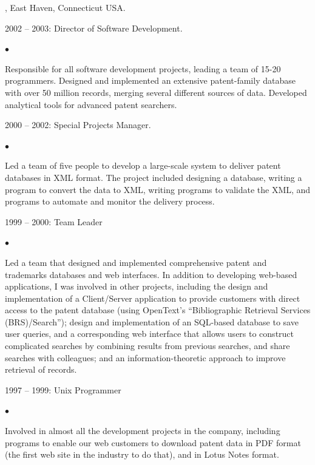 \documentclass[12pt,a4paper]{article}
\newenvironment{list1}{
  \begin{list}{\ding{113}}{%
      \setlength{\itemsep}{0in}
      \setlength{\parsep}{0in} \setlength{\parskip}{0in}
      \setlength{\topsep}{0in} \setlength{\partopsep}{0in}
      \setlength{\leftmargin}{0.17in}}}{\end{list}}
\newenvironment{list2}{
  \begin{list}{$\bullet$}{%
      \setlength{\itemsep}{0in}
      \setlength{\parsep}{0in} \setlength{\parskip}{0in}
      \setlength{\topsep}{0in} \setlength{\partopsep}{0in}
      \setlength{\leftmargin}{0.2in}}}{\end{list}}
\begin{document}
  
, East Haven, Connecticut USA.
\begin{list1}
\item[]  2002 -- 2003:  Director of Software Development.
\begin{list2}
\item[] Responsible for all software development projects, leading a team of 15-20
programmers.
Designed and implemented an extensive patent-family database with over 50
million records, merging several different sources of data. Developed analytical
tools for advanced patent searchers.
\end{list2}
\item[] 2000 -- 2002: Special Projects Manager.
\begin{list2}
\item[] Led a team of five people to develop a large-scale system to deliver patent
databases in XML format.  The project included designing a database, writing a
program to convert the data to XML, writing programs to validate the XML, and
programs to automate and monitor the delivery process.
\end{list2}
\item[] 1999 -- 2000: Team Leader
\begin{list2}
\item[] Led a team that designed and implemented comprehensive patent and trademarks
databases and web interfaces.  In addition to developing web-based applications,
I was involved in other projects, including the design and implementation of a
Client/Server application to provide customers with direct access to the patent
database (using OpenText's ``Bibliographic Retrieval Services (BRS)/Search'');
design and implementation of an SQL-based database to save user queries, and a
corresponding web interface that allows users to construct complicated searches
by combining results from previous searches, and share searches with colleagues;
and an information-theoretic approach to improve retrieval of records.
\end{list2}
\item[] 1997 -- 1999: Unix Programmer
\begin{list2}
\item[] Involved in almost all the development projects in the company, including
programs to enable our web customers to download patent data in PDF format (the
first web site in the industry to do that), and in Lotus Notes format.
\end{list2}
\end{list1}
\end{document}

